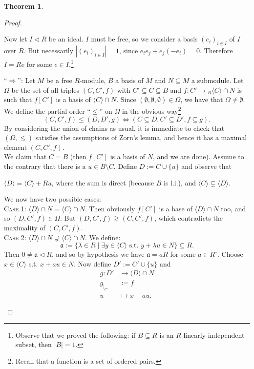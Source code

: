 \documentclass[12pt,a4paper]{report}
\theoremstyle{definition}
\newtheorem{theorem}{Theorem}[chapter] %
\theoremstyle{num.custom-title}
\DeclareMathOperator{\imp}{\Rightarrow}
\DeclareMathOperator{\sm}{\setminus}
\DeclareMathOperator{\sse}{\subseteq}
\renewcommand{\iff}{\Leftrightarrow}
\begin{document}
\begin{theorem}
\begin{proof}
\begin{enumerate}
Now let $I \lhd R$ be an ideal. $I$ must be free, so we consider a basis $(e_i)_{i \in I}$ of $I$ over $R$. But necessarily $|(e_i)_{i \in I}|=1$, since $e_i e_j + e_j (-e_i) = 0$. Therefore $I = R e$ for some $e \in I$.\footnote{Observe that we proved the following: if $B \sse R$ is an $R$-linearly independent subset, then $|B|=1$.}

``$\imp$'': Let $M$ be a free $R$-module, $B$ a basis of $M$ and $N \sse M$ a submodule. Let $\Omega$ be the set of all triples $(C,C',f)$ with $C' \sse C \sse B$ and $f: C' \to {}_R \langle C \rangle \cap N$ is such that $f[C']$ is a basis of $\langle C \rangle \cap N$. Since $(\emptyset, \emptyset, \emptyset) \in \Omega$, we have that $\Omega \neq \emptyset$. We define the partial order ``$\leq$'' on $\Omega$ in the obvious way\footnote{Recall that a function is a set of ordered pairs.}
\[
(C,C',f) \leq (D,D',g) \iff (C \sse D, C' \sse D', f \sse g).
\]
By considering the union of chains as usual, it is immediate to check that $(\Omega,\leq)$ satisfies the assumptions of Zorn's lemma, and hence it has a maximal element $(C,C',f)$.\\
We claim that $C=B$ (then $f[C']$ is a basis of $N$, and we are done). Assume to the contrary that there is a $u \in B \sm C$. Define $D := C \cup \{u\}$ and observe that
\begin{center}
$\langle D \rangle = \langle C \rangle + Ru$, where the sum is direct (because $B$ is l.i.), and $\langle C \rangle \subsetneq \langle D \rangle$.
\end{center}
We now have two possible cases:\\
\textsc{Case 1:} $\langle D \rangle \cap N = \langle C \rangle \cap N$. Then obviously $f[C']$ is a base of $\langle D \rangle \cap N$ too, and so $(D,C',f) \in \Omega$. But $(D,C',f) \gneq (C,C',f)$, which contradicts the maximality of $(C,C',f)$.\\
\textsc{Case 2:} $\langle D \rangle \cap N \supsetneq \langle C \rangle \cap N$. We define:
\[
\mathfrak{a} := \{\lambda \in R \mid \exists y \in \langle C \rangle \text{ s.t. } y + \lambda u \in N\} \sse R.
\]
Then $0 \neq \mathfrak{a} \lhd R$, and so by hypothesis we have $\mathfrak{a} = aR$ for some $a \in R^\circ$. Choose $x \in \langle C \rangle$ s.t. $x + au \in N$. Now define $D' := C' \cup \{u\}$ and
\begin{align*}
g \colon D' &\to \langle D \rangle \cap N \\
g_{|_{C'}} &:= f \\
u &\mapsto x + au.
\end{align*}

\end{enumerate}
\end{proof}
\end{theorem}
\end{document}
